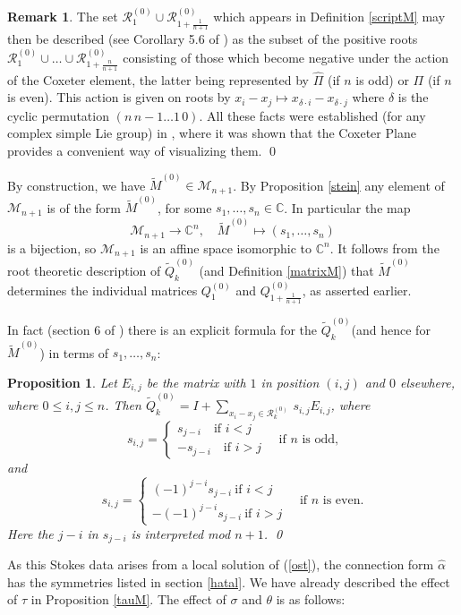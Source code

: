 \documentclass[a4paper,12pt,leqno]{amsart}
\numberwithin{equation}{section}
\theoremstyle{plain}
\newtheorem{proposition}[theorem]{Proposition}
\theoremstyle{definition}
\newtheorem{remark}[theorem]{Remark}
\newcommand{\C}{\mathbb C}
\newcommand{\al}{\alpha}
\newcommand{\de}{\delta}
\newcommand{\si}{\sigma}
\renewcommand{\th}{\theta}
\newcommand{\cR}{\mathcal{R}}
\newcommand{\cM}{\mathcal{M}}
\newcommand{\Qz}{  Q^{(0)}  }
\newcommand{\tQz}{  \tilde Q^{(0)}  }
\newcommand{\tMz}{  \tilde M^{(0)}  }
\newcommand{\cRz}{ \cR^{(0)}}
\begin{document}
\begin{remark}\label{coxeter}
The set $\cRz_1\cup \cRz_{1+\scriptstyle\frac 1{n+1}}$ which
appears in Definition \ref{scriptM} may then be described
(see Corollary 5.6 of \cite{GH2})  as the subset of
the positive roots
$\cRz_1\cup \dots\cup \cRz_{1+\scriptstyle\frac n{n+1}}$
consisting of those
which become negative under the action of the
Coxeter element, the latter being represented by $\hat\Pi$ (if $n$ is odd) or $\Pi$  (if $n$ is even).
This action is given on roots by $x_i-x_j\mapsto x_{\de\cdot i}-x_{\de\cdot j}$
where $\de$ is the cyclic permutation $(n \, n-1 \dots 1\, 0)$.
All these facts were established (for any complex simple Lie group) in
\cite{GH2}, where it was shown that the Coxeter Plane provides a
convenient way of visualizing them.
\qed
\end{remark}

By construction, we have $\tMz\in\cM_{n+1}$. By Proposition \ref{stein} any
element of $\cM_{n+1}$ is of the form $\tMz$, for some $s_1,\dots,s_n\in\C$.
In particular the map
\[
\cM_{n+1}\to \C^n, \quad \tMz\mapsto (s_1,\dots,s_n)
\]
is a
bijection, so $\cM_{n+1}$ is an affine space isomorphic to $\C^n$.
It follows from the root theoretic description of $\tQz_k$
(and Definition \ref{matrixM})  that
$\tMz$ determines the individual matrices
$\Qz_1$ and $\Qz_{1+\scriptstyle\frac1{n+1}}$,
as asserted earlier.

In fact (section 6 of \cite{GILX})
there is an
explicit formula for the $\tQz_k$(and hence for $\tMz$) in terms
of $s_1,\dots,s_n$:

\begin{proposition}\label{Qfroms}
Let $E_{i,j}$ be the matrix with $1$ in position $(i,j)$ and $0$
elsewhere, where $0\le i,j\le n$.
Then
$
\tQz_k=
I + \sum_{x_i-x_j\in \cRz_k}  \, s_{i,j} E_{i,j}$,
where
\[
s_{i,j}=
\begin{cases}
s_{j-i}  \quad\text{if $i<j$}
\\
-s_{j-i}  \quad\text{if $i>j$}
\end{cases}
\quad\text{if $n$ is odd,}
\]
and
\[
s_{i,j}=
\begin{cases}
(-1)^{j-i} s_{j-i} \ \text{if $i<j$}
\\
-(-1)^{j-i} s_{j-i} \ \text{if $i>j$}
\end{cases}
\quad\text{if $n$ is even.}
\]
Here the $j-i$ in $s_{j-i}$ is interpreted mod $n+1$.
\qed
\end{proposition}


As this Stokes data arises from a local solution of (\ref{ost}), the connection form
$\hat\al$ has the symmetries listed in section \ref{hatal}. We have already described the effect of $\tau$ in Proposition \ref{tauM}. The effect of $\si$ and $\th$ is as follows:
\end{document}
